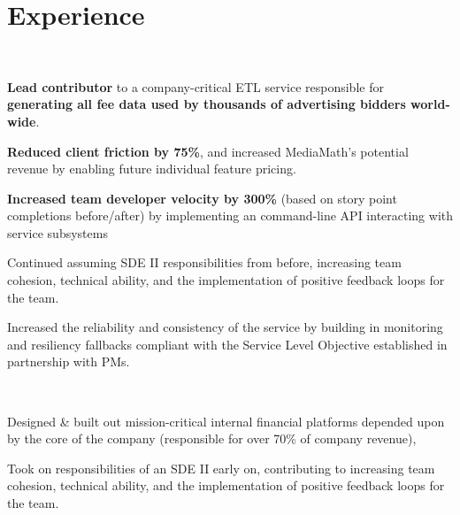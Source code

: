 \documentclass[]{hieudo-build}
\begin{document}
\begin{minipage}[t]{0.65\textwidth} 

\section{Experience}

 \\
 \vspace{\topsep} %
\begin{tightemize}
\item {\bf Lead contributor} to a company-critical ETL service responsible
for {\bf generating all fee data used by thousands of advertising bidders world-wide}.
\item {\bf Reduced client friction by 75\%}, and increased MediaMath's potential
revenue by enabling future individual feature pricing.
\item {\bf Increased team developer velocity by 300\%} (based on story point
completions before/after) by implementing an command-line API interacting
with service subsystems
\item Continued assuming SDE II responsibilities from before, increasing team cohesion,
technical ability, and the implementation of positive feedback loops for the team.
\item Increased the reliability and consistency of the service by building in
monitoring and resiliency fallbacks compliant with the Service Level
Objective established in partnership with PMs.
\end{tightemize}
\sectionsep

 \\
\begin{tightemize}
\item Designed \& built out mission-critical internal financial platforms depended upon by the core of the company (responsible for over 70\% of company revenue), 
\item Took on responsibilities of an SDE II early on, contributing to increasing team cohesion, technical ability, and the implementation of positive feedback loops for the team.
\end{tightemize}
\sectionsep


\end{minipage}
\end{document}
